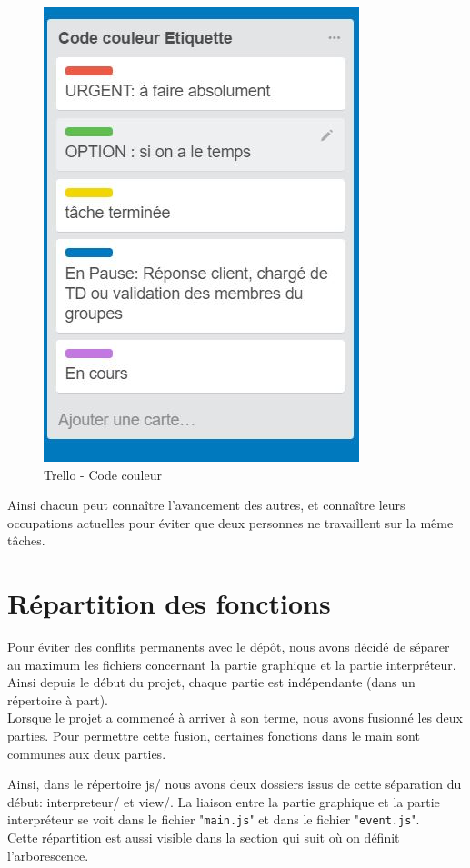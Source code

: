 \begin{figure}[H]
  \centering
    \includegraphics[scale=0.5]{images/trello_code_couleur.jpg}
        \caption{Trello - Code couleur}
\end{figure}
Ainsi chacun peut connaître l'avancement des autres, et connaître leurs occupations actuelles pour éviter que deux personnes ne travaillent sur la même tâches.

\section{Répartition des fonctions}%
Pour éviter des conflits permanents avec le dépôt, nous avons décidé de séparer au maximum les fichiers concernant la partie graphique et la partie interpréteur. Ainsi depuis le début du projet, chaque partie est indépendante (dans un répertoire à part). \\

Lorsque le projet a commencé à arriver à son terme, nous avons fusionné les deux parties. Pour permettre cette fusion, certaines fonctions dans le main sont communes aux deux parties.

Ainsi, dans le répertoire js/ nous avons deux dossiers issus de cette séparation du début: interpreteur/ et view/. La liaison entre la partie graphique et la partie interpréteur se voit dans le fichier "{\tt main.js}" et dans le fichier "{\tt event.js}".\\
Cette répartition est aussi visible dans la section qui suit où on définit l'arborescence.

